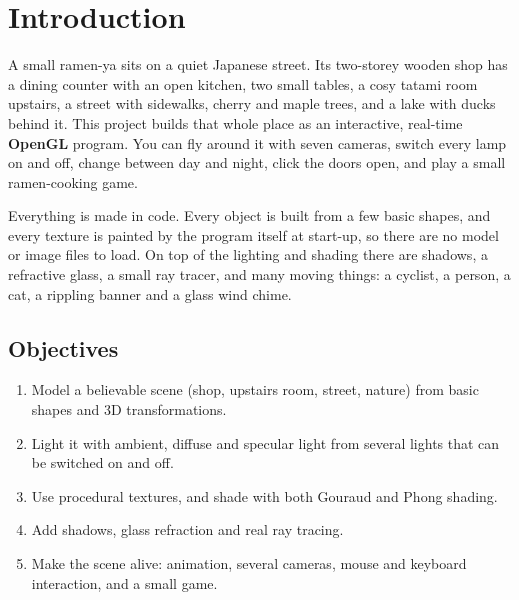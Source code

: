 \documentclass[10pt,a4paper]{article}
\begin{document}
{\small\tableofcontents}
\listoffigures
\listoftables
\newpage
\setcounter{page}{1}

\section{Introduction}
A small ramen-ya sits on a quiet Japanese street. Its two-storey wooden shop has a dining counter with an open kitchen, two small tables, a cosy tatami room upstairs, a street with sidewalks, cherry and maple trees, and a lake with ducks behind it. This project builds that whole place as an interactive, real-time \textbf{OpenGL} program. You can fly around it with seven cameras, switch every lamp on and off, change between day and night, click the doors open, and play a small ramen-cooking game.

Everything is made in code. Every object is built from a few basic shapes, and every texture is painted by the program itself at start-up, so there are no model or image files to load. On top of the lighting and shading there are shadows, a refractive glass, a small ray tracer, and many moving things: a cyclist, a person, a cat, a rippling banner and a glass wind chime.

\subsection{Objectives}
\begin{enumerate}
\item Model a believable scene (shop, upstairs room, street, nature) from basic shapes and 3D transformations.
\item Light it with ambient, diffuse and specular light from several lights that can be switched on and off.
\item Use procedural textures, and shade with both Gouraud and Phong shading.
\item Add shadows, glass refraction and real ray tracing.
\item Make the scene alive: animation, several cameras, mouse and keyboard interaction, and a small game.
\end{enumerate}
\end{document}
